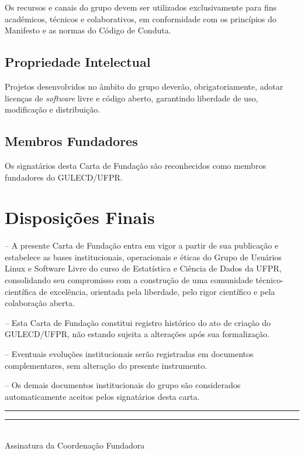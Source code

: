 \documentclass[
  12pt,          %
  a4paper,       %
  oneside,       %
  brazil         %
]{article}
\begin{document}
Os recursos e canais do grupo devem ser utilizados exclusivamente para fins acadêmicos, técnicos e colaborativos, 
em conformidade com os princípios do Manifesto e as normas do Código de Conduta.

\subsection{Propriedade Intelectual}

Projetos desenvolvidos no âmbito do grupo deverão, obrigatoriamente, adotar licenças de \textit{software} livre e código aberto, 
garantindo liberdade de uso, modificação e distribuição.

\subsection{Membros Fundadores}

Os signatários desta Carta de Fundação são reconhecidos como membros fundadores do GULECD/UFPR.

\section{Disposições Finais}

-- A presente Carta de Fundação entra em vigor a partir de sua publicação e estabelece as bases institucionais, operacionais e éticas do Grupo de Usuários Linux e Software Livre do curso de Estatística e Ciência de Dados da UFPR, consolidando seu compromisso com a construção de uma comunidade técnico-científica de excelência, orientada pela liberdade, pelo rigor científico e pela colaboração aberta.

-- Esta Carta de Fundação constitui registro histórico do ato de criação do GULECD/UFPR, não estando sujeita a alterações após sua formalização.

-- Eventuais evoluções institucionais serão registradas em documentos complementares, sem alteração do presente instrumento.

-- Os demais documentos institucionais do grupo são considerados automaticamente aceitos pelos signatários desta carta.

\pagebreak
\vspace{1cm}
\begin{center}
	\rule{0.45\textwidth}{0.4pt}\hfill\rule{0.45\textwidth}{0.4pt}\\[0.3em]
	\small\color{gulecdGray}
	Assinatura da Coordenação Fundadora
\end{center}
\end{document}
